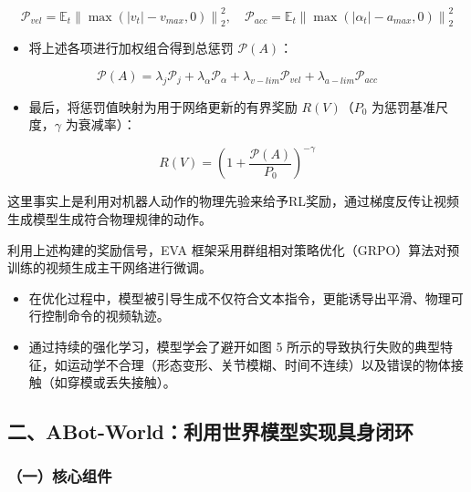 \[
\mathcal{P}_{vel} = \mathbb{E}_t\left\|\max(|v_t|-v_{max},0)\right\|_2^2, \quad
\mathcal{P}_{acc} = \mathbb{E}_t\left\|\max(|\alpha_t|-a_{max},0)\right\|_2^2
\]

\begin{itemize}
\tightlist
\item
  将上述各项进行加权组合得到总惩罚 \(\mathcal{P}(A)\)：
\end{itemize}

\[
\mathcal{P}(A) = \lambda_j\mathcal{P}_j + \lambda_{\alpha}\mathcal{P}_{\alpha} + \lambda_{v-lim}\mathcal{P}_{vel} + \lambda_{a-lim}\mathcal{P}_{acc}
\]

\begin{itemize}
\tightlist
\item
  最后，将惩罚值映射为用于网络更新的有界奖励 \(R(V)\)（\(P_0\) 为惩罚基准尺度，\(\gamma\) 为衰减率）：
\end{itemize}

\[
R(V) = \left(1 + \frac{\mathcal{P}(A)}{P_0}\right)^{-\gamma}
\]

这里事实上是利用对机器人动作的物理先验来给予RL奖励，通过梯度反传让视频生成模型生成符合物理规律的动作。

利用上述构建的奖励信号，EVA 框架采用群组相对策略优化（GRPO）算法对预训练的视频生成主干网络进行微调。

\begin{itemize}
\tightlist
\item
  在优化过程中，模型被引导生成不仅符合文本指令，更能诱导出平滑、物理可行控制命令的视频轨迹。
\item
  通过持续的强化学习，模型学会了避开如图 5 所示的导致执行失败的典型特征，如运动学不合理（形态变形、关节模糊、时间不连续）以及错误的物体接触（如穿模或丢失接触）。
\end{itemize}

\hypertarget{ux4e8cabot-worldux5229ux7528ux4e16ux754cux6a21ux578bux5b9eux73b0ux5177ux8eabux95edux73af}{%
\subsection{二、ABot-World：利用世界模型实现具身闭环}\label{ux4e8cabot-worldux5229ux7528ux4e16ux754cux6a21ux578bux5b9eux73b0ux5177ux8eabux95edux73af}}

\hypertarget{ux4e00ux6838ux5fc3ux7ec4ux4ef6-1}{%
\subsubsection{（一）核心组件}\label{ux4e00ux6838ux5fc3ux7ec4ux4ef6-1}}

